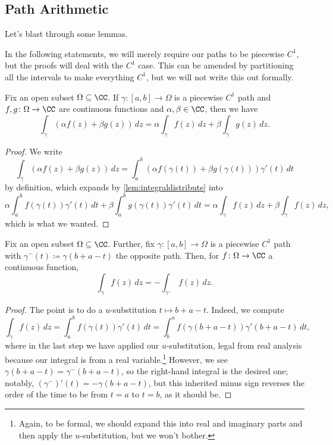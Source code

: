 \subsection{Path Arithmetic}
Let's blast through some lemmas.
\begin{warn}
	In the following statements, we will merely require our paths to be piecewise $C^1$, but the proofs will deal with the $C^1$ case. This can be amended by partitioning all the intervals to make everything $C^1$, but we will not write this out formally.
\end{warn}
\begin{lemma}
	Fix an open subset $\Omega\subseteq\CC$. If $\gamma\colon [a,b]\to\Omega$ is a piecewise $C^1$ path and $f,g\colon \Omega\to\CC$ are continuous functions and $\alpha,\beta\in\CC$, then we have
	\[\int_\gamma(\alpha f(z)+\beta g(z))\,dz=\alpha\int_\gamma f(z)\,dz+\beta\int_\gamma g(z)\,dz.\]
\end{lemma}
\begin{proof}
	We write
	\[\int_\gamma(\alpha f(z)+\beta g(z))\,dz=\int_a^b(\alpha f(\gamma(t))+\beta g(\gamma(t)))\gamma'(t)\,dt\]
	by definition, which expands by \autoref{lem:integraldistribute} into
	\[\alpha\int_a^bf(\gamma(t))\gamma'(t)\,dt+\beta\int_a^bg(\gamma(t))\gamma'(t)\,dt=\alpha\int_\gamma f(z)\,dz+\beta\int_\gamma f(z)\,dz,\]
	which is what we wanted.
\end{proof}
\begin{lemma} \label{lem:opposite}
	Fix an open subset $\Omega\subseteq\CC$. Further, fix $\gamma\colon [a,b]\to\Omega$ is a piecewise $C^1$ path with $\gamma^-(t)\coloneqq \gamma(b+a-t)$ the opposite path. Then, for $f\colon \Omega\to\CC$ a continuous function,
	\[\int_\gamma f(z)\,dz=-\int_{\gamma^-}f(z)\,dz.\]
\end{lemma}
\begin{proof}
	The point is to do a $u$-substitution $t\mapsto b+a-t$. Indeed, we compute
	\[\int_\gamma f(z)\,dz=\int_a^bf(\gamma(t))\gamma'(t)\,dt=\int_b^af(\gamma(b+a-t))\gamma'(b+a-t)\,dt,\]
	where in the last step we have applied our $u$-substitution, legal from real analysis because our integral is from a real variable.\footnote{Again, to be formal, we should expand this into real and imaginary parts and then apply the $u$-substitution, but we won't bother.} However, we see $\gamma(b+a-t)=\gamma^-(b+a-t)$, so the right-hand integral is the desired one; notably, $(\gamma^-)'(t)=-\gamma(b+a-t)$, but this inherited minus sign reverses the order of the time to be from $t=a$ to $t=b$, as it should be.
\end{proof}
